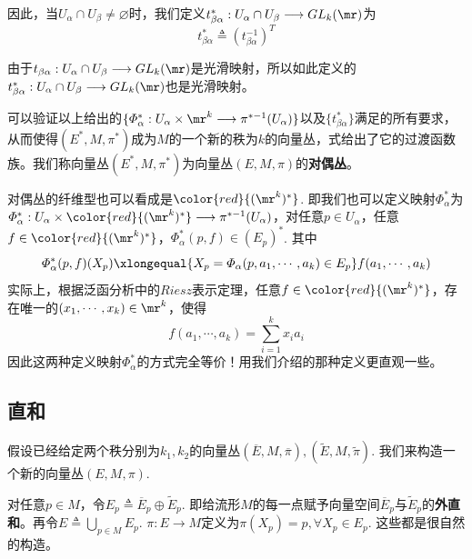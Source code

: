  因此，当$U_{\alpha}\cap U_{\beta}\neq\varnothing$时，我们定义$t^{\ast}_{\beta\alpha}:U_{\alpha}\cap U_{\beta}\longrightarrow GL_{k}(\mr)$为
 \begin{equation}
 	t^{\ast}_{\beta\alpha}\triangleq \left(t^{-1}_{\beta\alpha}\right)^{T}
 \end{equation}
 
 由于$t_{\beta\alpha}:U_{\alpha}\cap U_{\beta}\longrightarrow GL_{k}(\mr)$是光滑映射，所以如此定义的$t^{\ast}_{\beta\alpha}:U_{\alpha}\cap U_{\beta}\longrightarrow GL_{k}(\mr)$也是光滑映射。
 
 可以验证以上给出的$\{\varPhi^{\ast}_{\alpha} :U_{\alpha}\times \mr^{k}\longrightarrow \pi^{\ast -1}(U_{\alpha})\}$以及$\{ t^{\ast}_{\beta\alpha} \}$满足的所有要求，从而使得$(E^{\ast},M,\pi^{\ast})$成为$M$的一个新的秩为$k$的向量丛，式给出了它的过渡函数族。我们称向量丛$(E^{\ast},M,\pi^{\ast})$为向量丛$(E,M,\pi)$的\textbf{对偶丛}。

\begin{remark}
	对偶丛的纤维型也可以看成是${\color{red}{(\mr^{k})^{\ast}}}$. 即我们也可以定义映射$\varPhi^{\ast}_{\alpha}$为
	$\varPhi^{\ast}_{\alpha} :U_{\alpha}\times {\color{red}{(\mr^{k})^{\ast}}}\longrightarrow \pi^{\ast -1}(U_{\alpha})$，对任意$p\in U_{\alpha}$，任意$f\in {\color{red}{(\mr^{k})^{\ast}}}$，$\varPhi^{\ast}_{\alpha}(p,f)\in (E_{p})^{\ast}$. 其中
	\[
	\varPhi^{\ast}_{\alpha}(p,f)(X_{p})\xlongequal{X_{p}=\varPhi_{\alpha}(p,a_{1},\cdots,a_{k})\in E_{p}}f(a_{1},\cdots,a_{k})
	\]
	实际上，根据泛函分析中的$Riesz$表示定理，任意$f\in {\color{red}{(\mr^{k})^{\ast}}}$，存在唯一的$(x_{1},\cdots,x_{k})\in\mr^{k}$，使得
	\[
	f(a_{1},\cdots,a_{k})=\sum_{ i = 1 }^{k}x_{i}a_{i}
	\]
	因此这两种定义映射$\varPhi^{\ast}_{\alpha}$的方式完全等价！用我们介绍的那种定义更直观一些。
\end{remark}

\subsection{直和}

假设已经给定两个秩分别为$k_{1},k_{2}$的向量丛$(\overline{E},M,\overline{\pi}),(\tilde{E},M,\tilde{\pi})$. 我们来构造一个新的向量丛$(E,M,\pi)$.

对任意$p\in M$，令$E_{p}\triangleq \overline{E}_{p}\oplus \tilde{E}_{p}$. 即给流形$M$的每一点赋予向量空间$\overline{E}_{p}$与$\tilde{E}_{p}$的\textbf{外直和}。再令$E\triangleq \bigcup\limits_{p\in M}E_{p}$. $\pi:E\longrightarrow M$定义为$\pi(X_{p})=p,\forall X_{p}\in E_{p}$. 这些都是很自然的构造。

